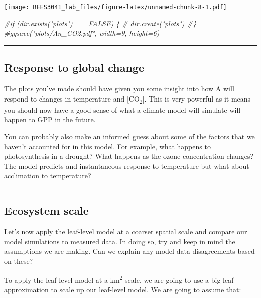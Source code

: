 \documentclass[]{article}
\newenvironment{Shaded}{\begin{snugshade}}{\end{snugshade}}
\newcommand{\CommentTok}[1]{\textcolor[rgb]{0.56,0.35,0.01}{\textit{#1}}}
\begin{document}
\texttt{[image: BEES3041\_lab\_files/figure-latex/unnamed-chunk-8-1.pdf]}

\begin{Shaded}
\begin{Highlighting}[]
\CommentTok{#if (dir.exists("plots") == FALSE) \{}
\CommentTok{#  dir.create("plots")}
\CommentTok{#\}}
\CommentTok{#ggsave("plots/An_CO2.pdf", width=9, height=6)  }
\end{Highlighting}
\end{Shaded}

\begin{center}\rule{0.5\linewidth}{\linethickness}\end{center}

\hypertarget{response-to-global-change}{%
\subsection{Response to global change}\label{response-to-global-change}}

The plots you've made should have given you some insight into how A will
respond to changes in temperature and {[}CO\textsubscript{2}{]}. This is
very powerful as it means you should now have a good sense of what a
climate model will simulate will happen to GPP in the future.

You can probably also make an informed guess about some of the factors
that we haven't accounted for in this model. For example, what happens
to photosynthesis in a drought? What happens as the ozone concentration
changes? The model predicts and instantaneous response to temperature
but what about acclimation to temperature?

\begin{center}\rule{0.5\linewidth}{\linethickness}\end{center}

\hypertarget{ecosystem-scale}{%
\subsection{Ecosystem scale}\label{ecosystem-scale}}

Let's now apply the leaf-level model at a coarser spatial scale and
compare our model simulations to measured data. In doing so, try and
keep in mind the assumptions we are making. Can we explain any
model-data disagreements based on these?

To apply the leaf-level model at a km\textsuperscript{2} scale, we are
going to use a big-leaf approximation to scale up our leaf-level model.
We are going to assume that:
\end{document}
